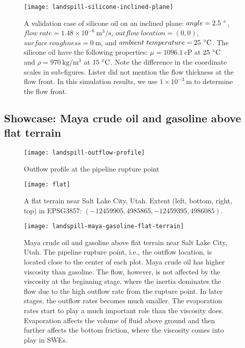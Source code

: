 \begin{figure*}
    \centering
    \texttt{[image: landspill-silicone-inclined-plane]}
    \caption{%
        A validation case of silicone oil on an inclined plane: $angle=2.5\ \mathrm{\degree}$, $flow\ rate=1.48\times 10^{-6}\ \mathrm{m^3/s}$, $outflow\ location=(0, 0)$, $surface\ roughness=0\ \mathrm{m}$, and $ambient\ temperature=25\ \mathrm{\degree C}$. %
        The silicone oil have the following properties: $\mu=1096.1\ \mathrm{cP}$ at $25\ \mathrm{\degree C}$ and $\rho=970\ \mathrm{kg/m^3}$ at $15\ \mathrm{\degree C}$. %
        Note the difference in the coordinate scales in sub-figures. %
        Lister did not mention the flow thickness at the flow front. %
        In this simulation results, we use $1\times 10^{-3}\ \mathrm{m}$ to determine the flow front.%
    }\label{fig:landspill-silicone-inclined}
\end{figure*}

\subsection{Showcase: Maya crude oil and gasoline above flat terrain}

\begin{figure}
    \centering
    \texttt{[image: landspill-outflow-profile]}
    \caption{Outflow profile at the pipeline rupture point}\label{fig:outflow-profile}
\end{figure}

\begin{figure}
    \centering
    \texttt{[image: flat]}
    \caption{%
        A flat terrain near Salt Lake City, Utah. %
        Extent (left, bottom, right, top) in EPSG3857: $(-12459905, 4985865, -12459395, 4986085)$.
    }\label{fig:flat-terrain-satellite}
\end{figure}

\begin{figure*}
    \texttt{[image: landspill-maya-gasoline-flat-terrain]}
    \caption{%
        Maya crude oil and gasoline above flat terrain near Salt Lake City, Utah. %
        The pipeline rupture point, i.e., the outflow location, is located close to the center of each plot. %
        Maya crude oil has higher viscosity than gasoline. %
        The flow, however, is not affected by the viscosity at the beginning stage, where the inertia dominates the flow due to the high outflow rate from the rupture point. %
        In later stages, the outflow rates becomes much smaller. %
        The evaporation rates start to play a much important role than the viscosity does. %
        Evaporation affects the volume of fluid above ground and then further affects the bottom friction, where the viscosity comes into play in SWEs.%
    }\label{fig:landspill-maya-gasoline-flat}
\end{figure*}

